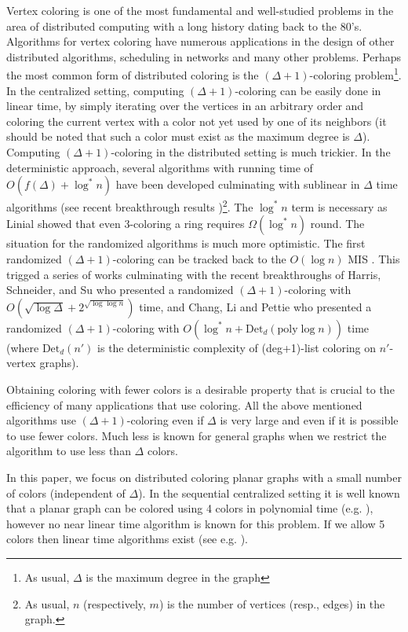 \documentclass{article}
\theoremstyle{definition}
\begin{document}
Vertex coloring is one of the most fundamental and well-studied problems in the area of distributed computing with a long history dating back to the 80's. Algorithms for vertex coloring have numerous applications in the design of other distributed algorithms, scheduling in networks and many other problems.
Perhaps the most common form of distributed coloring is the $(\Delta+1)$-coloring problem\footnote{As usual, $\Delta$ is the maximum degree in the graph}.
In the centralized setting, computing $(\Delta+1)$-coloring can be easily done in linear time, by simply iterating over the vertices in an arbitrary order and coloring the current vertex with a color not yet used by one of its neighbors (it should be noted that such a color must exist as the maximum degree is $\Delta$).
Computing $(\Delta+1)$-coloring in the distributed setting is much trickier.
In the deterministic approach, several algorithms with running
time of $O(f(\Delta) + \log^*n)$ have been developed \cite{BarenboimEK14,Linial90,Goldberg87,GoPl87} culminating with sublinear in $\Delta$ time algorithms (see recent breakthrough results \cite{Barenboim15,FrHeKo15})\footnote{As usual, $n$ (respectively, $m$) is the number of vertices (resp., edges) in the graph.}.
The $\log^*n$ term is necessary as Linial \cite{Linial90} showed that even 3-coloring a ring requires $\Omega(\log^*n)$ round.
The situation for the randomized algorithms is much more optimistic.
The first randomized $(\Delta+1)$-coloring can be tracked back to the $O(\log{n})$ MIS \cite{Luby85,ABI86}.
This trigged a series of works culminating with the recent breakthroughs of
Harris, Schneider, and Su \cite{HaScSu16} who presented a randomized $(\Delta+1)$-coloring with $O(\sqrt{\log{\Delta}} + 2^{\sqrt{\log\log{n}}})$ time, and Chang, Li and Pettie \cite{Pet15} who presented a randomized $(\Delta+1)$-coloring with $O(\log^*n + \text{Det}_d(\text{poly} \log n))$ time (where $\text{Det}_d(n')$ is the deterministic complexity of (deg+1)-list coloring on $n'$-vertex graphs).

Obtaining coloring with fewer colors is a desirable property that is crucial to the efficiency of many applications that use coloring.
All the above mentioned algorithms use $(\Delta+1)$-coloring even if $\Delta$ is very large and even if it is possible to use fewer colors.
Much less is known for general graphs when we restrict the algorithm to use less than $\Delta$ colors.

In this paper, we focus on distributed coloring planar graphs with a small number of colors (independent of $\Delta$).
In the sequential centralized setting it is well known that a planar graph can be colored using 4 colors in polynomial time (e.g. \cite{appel1989}), however no near linear time algorithm is known for this problem.
If we allow 5 colors then linear time algorithms exist (see e.g. \cite{Chiba81}).
\end{document}

